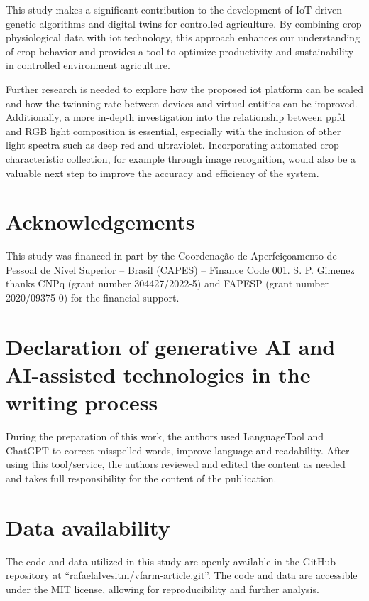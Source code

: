 \documentclass[preprint, review, 12pt]{elsarticle}
\begin{document}
This study makes a significant contribution to the development of IoT-driven genetic algorithms and digital twins for controlled agriculture. By combining crop physiological data with \gls{iot} technology, this approach enhances our understanding of crop behavior and provides a tool to optimize productivity and sustainability in controlled environment agriculture.

Further research is needed to explore how the proposed \gls{iot} platform can be scaled and how the twinning rate between devices and virtual entities can be improved. Additionally, a more in-depth investigation into the relationship between \gls{ppfd} and RGB light composition is essential, especially with the inclusion of other light spectra such as deep red and ultraviolet. Incorporating automated crop characteristic collection, for example through image recognition, would also be a valuable next step to improve the accuracy and efficiency of the system.

\section*{Acknowledgements}

This study was financed in part by the Coordenação de Aperfeiçoamento de Pessoal de Nível Superior – Brasil (CAPES) – Finance Code 001. S. P. Gimenez thanks CNPq (grant number 304427/2022-5) and FAPESP (grant number 2020/09375-0) for the financial support.

\section*{Declaration of generative AI and AI-assisted technologies in the writing process}

During the preparation of this work, the authors used LanguageTool and ChatGPT to correct misspelled words, improve language and readability. After using this tool/service, the authors reviewed and edited the content as needed and takes full responsibility for the content of the publication.

\section*{Data availability}
\label{sec:dataAvailability}

The code and data utilized in this study are openly available in the GitHub repository at ``rafaelalvesitm/vfarm-article.git''. The code and data are accessible under the MIT license, allowing for reproducibility and further analysis.
\end{document}
